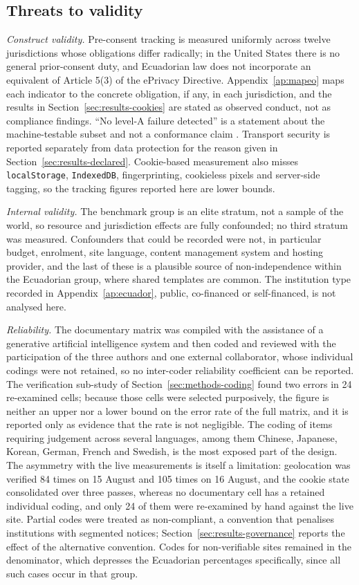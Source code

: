 \documentclass[]{interact}
\begin{document}
\subsection{Threats to validity}\label{sec:threats}

\emph{Construct validity.} Pre-consent tracking is measured uniformly across twelve jurisdictions whose obligations differ radically; in the United States there is no general prior-consent duty, and Ecuadorian law does not incorporate an equivalent of Article 5(3) of the ePrivacy Directive. Appendix~\ref{ap:mapeo} maps each indicator to the concrete obligation, if any, in each jurisdiction, and the results in Section~\ref{sec:results-cookies} are stated as observed conduct, not as compliance findings. ``No level-A failure detected'' is a statement about the machine-testable subset and not a conformance claim \citep{fischer2025coverage}. Transport security is reported separately from data protection for the reason given in Section~\ref{sec:results-declared}. Cookie-based measurement also misses \verb|localStorage|, \verb|IndexedDB|, fingerprinting, cookieless pixels and server-side tagging, so the tracking figures reported here are lower bounds.

\emph{Internal validity.} The benchmark group is an elite stratum, not a sample of the world, so resource and jurisdiction effects are fully confounded; no third stratum was measured. Confounders that could be recorded were not, in particular budget, enrolment, site language, content management system and hosting provider, and the last of these is a plausible source of non-independence within the Ecuadorian group, where shared templates are common. The institution type recorded in Appendix~\ref{ap:ecuador}, public, co-financed or self-financed, is not analysed here.

\emph{Reliability.} The documentary matrix was compiled with the assistance of a generative artificial intelligence system and then coded and reviewed with the participation of the three authors and one external collaborator, whose individual codings were not retained, so no inter-coder reliability coefficient can be reported. The verification sub-study of Section~\ref{sec:methods-coding} found two errors in 24 re-examined cells; because those cells were selected purposively, the figure is neither an upper nor a lower bound on the error rate of the full matrix, and it is reported only as evidence that the rate is not negligible. The coding of items requiring judgement across several languages, among them Chinese, Japanese, Korean, German, French and Swedish, is the most exposed part of the design. The asymmetry with the live measurements is itself a limitation: geolocation was verified 84 times on 15 August and 105 times on 16 August, and the cookie state consolidated over three passes, whereas no documentary cell has a retained individual coding, and only 24 of them were re-examined by hand against the live site. Partial codes were treated as non-compliant, a convention that penalises institutions with segmented notices; Section~\ref{sec:results-governance} reports the effect of the alternative convention. Codes for non-verifiable sites remained in the denominator, which depresses the Ecuadorian percentages specifically, since all such cases occur in that group.
\end{document}
